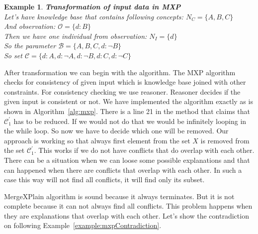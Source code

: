 \documentclass[12pt,a4paper]{article}
\newtheorem{example}{Example}[subsection]
\begin{document}
\begin{example}{\textbf{Transformation of input data in MXP}} \\
	\label{example:mxpTransform}
	\noindent Let's have knowledge base that contains following concepts: 
	$N_{C} = \{ A, B, C \}$ \\
	And observation: $\mathcal{O} = \{ d:B \}$ \\
	Then we have one individual from observation: $N_{I} = \{ d \} $ \\
	So the parameter $\mathcal{B} = \{ A,B,C, d: \neg B  \} $ \\
	So set $\mathcal{C} = \{ d:A, d:\neg A, d:\neg B, d:C, d:\neg C \}$
\end{example}

After transformation we can begin with the algorithm. The MXP algorithm checks for consistency of given input which is knowledge base joined with other constraints. For consistency checking we use reasoner. Reasoner decides if the given input is consistent or not. We have implemented the algorithm exactly as is shown in Algorithm~\ref{alg:mxp}.
There is a line 21 in the method  that claims that $\mathcal{C}^{\prime}_{1}$ has to be reduced. If we would not do that we would be infinitely looping in the while loop. So now we have to decide which one will be removed. Our approach is working so that always first element from the set $X$ is removed from the set $\mathcal{C}^{\prime}_{1}$. This works if we do not have conflicts that do overlap with each other. There can be a situation when we can loose some possible explanations and that can happened when there are conflicts that overlap with each other. In such a case this way will not find all conflicts, it will find only its subset. 

MergeXPlain algorithm is sound because it always terminates. But it is not complete because it can not always find all conflicts. This problem happens when they are explanations that  overlap with each other. Let's show the contradiction on following Example~\ref{example:mxpContradiction}.
\end{document}

